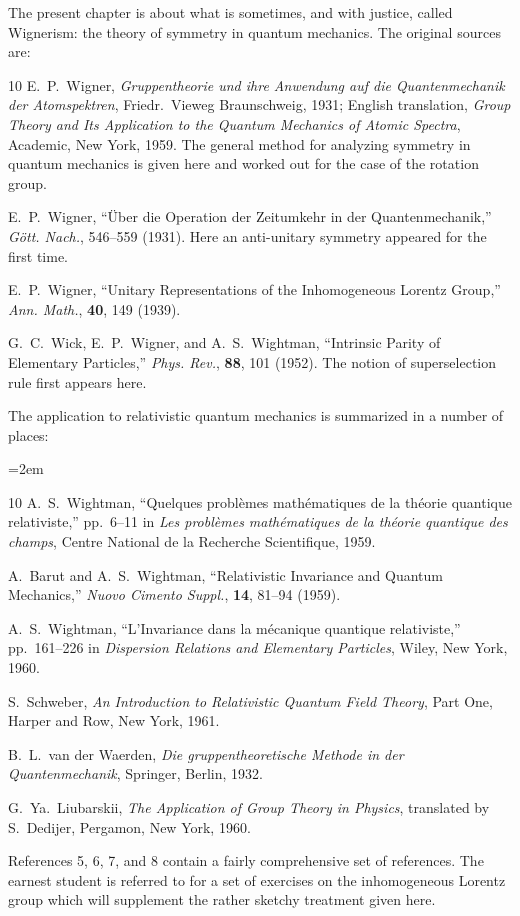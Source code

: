 \label{sec:1.4-bibliography}

The present chapter is about what is sometimes, and with justice, called
Wignerism: the theory of symmetry in quantum mechanics. The original sources
are:

\begin{thebibliography}{10}
E.~P.~Wigner, \emph{Gruppentheorie und ihre Anwendung auf die Quantenmechanik
der Atomspektren}, Friedr.~Vieweg Braunschweig, 1931; English translation,
\emph{Group Theory and Its Application to the Quantum Mechanics of Atomic
Spectra}, Academic, New York, 1959. The general method for analyzing
symmetry in quantum mechanics is given here and worked out for the case of the
rotation group.

E.~P.~Wigner, ``\"Uber die Operation der Zeitumkehr in der Quantenmechanik,''
\emph{G\"ott. Nach.}, 546--559 (1931). Here an anti-unitary symmetry appeared
for the first time.

E.~P.~Wigner, ``Unitary Representations of the Inhomogeneous Lorentz Group,''
\emph{Ann. Math.}, \textbf{40}, 149 (1939).

G.~C.~Wick, E.~P.~Wigner, and A.~S.~Wightman, ``Intrinsic Parity of Elementary
Particles,'' \emph{Phys. Rev.}, \textbf{88}, 101 (1952). The notion of
superselection rule first appears here.
\end{thebibliography}

The application to relativistic quantum mechanics is summarized in a number of
places:

{\emergencystretch=2em
\begin{thebibliography}{10}
\setcounter{NAT@ctr}{4}
A.~S.~Wightman, ``Quelques probl\`emes math\'ematiques de la th\'eorie
quantique relativiste,'' pp.~6--11 in \emph{Les probl\`emes math\'ematiques de
la th\'eorie quantique des champs}, Centre National de la Recherche
Scientifique, 1959.

A.~Barut and A.~S.~Wightman, ``Relativistic Invariance and Quantum Mechanics,''
\emph{Nuovo Cimento Suppl.}, \textbf{14}, 81--94 (1959).

A.~S.~Wightman, ``L'Invariance dans la m\'ecanique quantique relativiste,''
pp.~161--226 in \emph{Dispersion Relations and Elementary Particles}, Wiley,
New York, 1960.

S.~Schweber, \emph{An Introduction to Relativistic Quantum Field Theory}, Part
One, Harper and Row, New York, 1961.

B.~L.~van der Waerden, \emph{Die gruppentheoretische Methode in der
Quantenmechanik}, Springer, Berlin, 1932.

G.~Ya.~Liubarskii, \emph{The Application of Group Theory in Physics}, translated
by S.~Dedijer, Pergamon, New York, 1960.
\end{thebibliography}
}

References 5, 6, 7, and 8 contain a fairly comprehensive set of references. The
earnest student is referred to \cite{ref:1.7} for a set of exercises on the
inhomogeneous Lorentz group which will supplement the rather sketchy treatment
given here.
